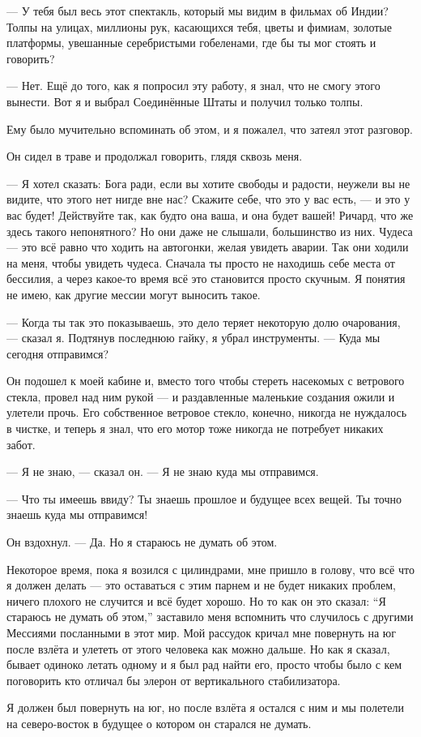 --- У тебя был весь этот спектакль, который мы видим в фильмах об Индии? Толпы на улицах, миллионы рук, касающихся тебя, цветы и фимиам, золотые платформы, увешанные серебристыми гобеленами, где бы ты мог стоять и говорить?

--- Нет. Ещё до того, как я попросил эту работу, я знал, что не смогу этого вынести. Вот я и выбрал Соединённые Штаты и получил только толпы.

Ему было мучительно вспоминать об этом, и я пожалел, что затеял этот разговор.

Он сидел в траве и продолжал говорить, глядя сквозь меня.

--- Я хотел сказать: Бога ради, если вы хотите свободы и радости, неужели вы не видите, что этого
нет нигде вне нас? Скажите себе, что это у вас есть, --- и это у вас будет! Действуйте так, как
будто она ваша, и она будет вашей! Ричард, что же здесь такого непонятного? Но они даже не
слышали, большинство из них. Чудеса --- это всё равно что ходить на автогонки, желая увидеть
аварии. Так они ходили на меня, чтобы увидеть чудеса. Сначала ты просто не находишь себе места от
бессилия, а через какое-то время всё это становится просто скучным. Я понятия не имею, как другие
мессии могут выносить такое.

--- Когда ты так это показываешь, это дело теряет некоторую долю очарования, --- сказал я.
Подтянув последнюю гайку, я убрал инструменты. --- Куда мы сегодня отправимся?

Он подошел к моей кабине и, вместо того чтобы стереть насекомых с ветрового стекла, провел над
ним рукой --- и раздавленные маленькие создания ожили и улетели прочь. Его собственное ветровое
стекло, конечно, никогда не нуждалось в чистке, и теперь я знал, что его мотор тоже никогда не
потребует никаких забот.

--- Я не знаю, --- сказал он. --- Я не знаю куда мы отправимся.

--- Что ты имеешь ввиду? Ты знаешь прошлое и будущее всех вещей.
Ты точно знаешь куда мы отправимся!

Он вздохнул. --- Да. Но я стараюсь не думать об этом.

Некоторое время, пока я возился с цилиндрами, мне пришло в голову, что всё что я должен делать ---
это оставаться с этим парнем и не будет никаких проблем, ничего плохого не случится и всё
будет хорошо. Но то как он это сказал: ``Я стараюсь не думать об этом,'' заставило меня
вспомнить что случилось с другими Мессиями посланными в этот мир. Мой рассудок кричал мне
повернуть на юг после взлёта и улететь от этого человека как можно дальше. Но как я сказал,
бывает одиноко летать одному и я был рад найти его, просто чтобы было с кем поговорить кто
отличал бы элерон от вертикального стабилизатора.

Я должен был повернуть на юг, но после взлёта я остался с ним и мы полетели на северо-восток
в будущее о котором он старался не думать.

\bye
